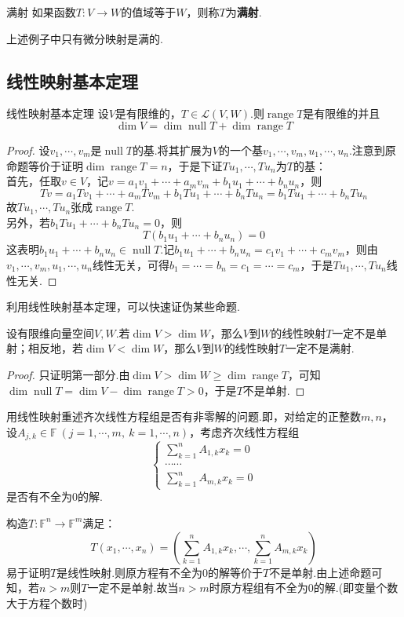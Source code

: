 \documentclass[lang=cn, zihao=5]{elegantbook}
\newcommand{\ssb}[1]{\left( #1 \right)}
\newcommand{\F}{\mathbb{F}}
\newcommand{\lmap}{\mathcal{L}}
\DeclareMathOperator{\nul}{null}
\DeclareMathOperator{\rge}{range}
\begin{document}
\begin{definition}{满射}
	如果函数$T:V \to W$的值域等于$W$，则称$T$为\textbf{满射}.
\end{definition}

上述例子中只有微分映射是满的.

\subsection{线性映射基本定理}

\begin{proposition}{线性映射基本定理}
	设$V$是有限维的，$T \in \lmap (V,W)$.则$\rge T$是有限维的并且$$\dim V = \dim \nul T + \dim \rge T$$
\end{proposition}
\begin{proof}
	设$v_1, \cdots ,v_m$是$\nul T$的基.将其扩展为$V$的一个基$v_1, \cdots ,v_m ,u_1, \cdots ,u_n$.注意到原命题等价于证明$\dim \rge T = n$，于是下证$Tu_1, \cdots ,Tu_n$为$T$的基： \\
	首先，任取$v \in V$，记$v=a_1v_1 + \cdots + a_mv_m + b_1u_1 + \cdots + b_nu_n$，则$$Tv = a_1Tv_1 + \cdots + a_mTv_m + b_1Tu_1 + \cdots + b_nTu_n = b_1Tu_1 + \cdots + b_nTu_n$$
	故$Tu_1, \cdots ,Tu_n$张成$\rge T$. \\
	另外，若$b_1Tu_1 + \cdots + b_nTu_n=0$，则$$T(b_1u_1 + \cdots + b_nu_n)=0$$
	这表明$b_1u_1 + \cdots + b_nu_n \in \nul T$.记$b_1u_1 + \cdots + b_nu_n = c_1v_1 + \cdots + c_mv_m$，则由$v_1, \cdots ,v_m,u_1, \cdots ,u_n$线性无关，可得$b_1= \cdots = b_n = c_1 = \cdots = c_m$，于是$Tu_1, \cdots ,Tu_n$线性无关.
\end{proof}

利用线性映射基本定理，可以快速证伪某些命题.

\begin{proposition}
	设有限维向量空间$V,W$.若$\dim V > \dim W$，那么$V$到$W$的线性映射$T$一定不是单射；相反地，若$\dim V < \dim W$，那么$V$到$W$的线性映射$T$一定不是满射.
\end{proposition}
\begin{proof}
	只证明第一部分.由$\dim V > \dim W \geq \dim \rge T$，可知$\dim \nul T = \dim V - \dim \rge T > 0$，于是$T$不是单射.
\end{proof}

\begin{example}
	用线性映射重述齐次线性方程组是否有非零解的问题.即，对给定的正整数$m,n$，设$A_{j,k} \in \F ~(j=1,\cdots ,m,~k=1,\cdots ,n)$，考虑齐次线性方程组$$\begin{cases}
		\sum_{k=1}^{n} A_{1,k}x_k = 0 \\
		\cdots \cdots \\
		\sum_{k=1}^{n} A_{m,k}x_k = 0
	\end{cases}$$是否有不全为$0$的解.
\end{example}
\begin{solution}
	构造$T:\F ^n \to \F ^m$满足：$$T(x_1, \cdots ,x_n) = \ssb{\sum_{k=1}^{n} A_{1,k}x_k, \cdots , \sum_{k=1}^{n} A_{m,k}x_k}$$
	易于证明$T$是线性映射.则原方程有不全为$0$的解等价于$T$不是单射.由上述命题可知，若$n>m$则$T$一定不是单射.故当$n > m$时原方程组有不全为$0$的解.(即变量个数大于方程个数时)
\end{solution}
\end{document}
